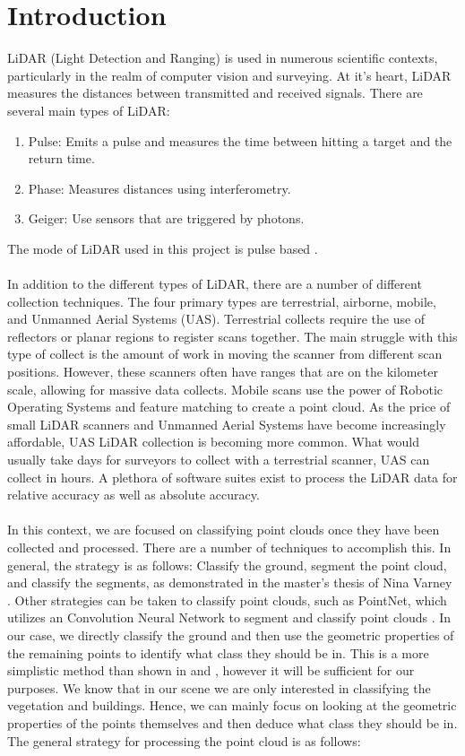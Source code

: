 \documentclass[11pt]{article}
\theoremstyle{definition}
\begin{document}
	\section{Introduction}\label{sec:intro}
	LiDAR (Light Detection and Ranging) is used in numerous scientific contexts, particularly in the realm of computer vision and surveying.  At it's heart, LiDAR measures the distances between transmitted and received signals.  There are several main types of LiDAR:
	\begin{enumerate}  
		\item Pulse: Emits a pulse and measures the time between hitting a target and the return time. 
		\item Phase: Measures distances using interferometry. 
		\item Geiger: Use sensors that are triggered by photons. 

	\end{enumerate}
	The mode of LiDAR used in this project is pulse based \cite{pdal}. 
	\\\\
	In addition to the different types of LiDAR, there are a number of different collection techniques.  The four primary types are terrestrial, airborne, mobile, and Unmanned Aerial Systems (UAS).  Terrestrial collects require the use of reflectors or planar regions to register scans together. The main struggle with this type of collect is the amount of work in moving the scanner from different scan positions.  However, these scanners often have ranges that are on the kilometer scale, allowing for massive data collects.  Mobile scans use the power of Robotic Operating Systems and feature matching to create a point cloud.  As the price of small LiDAR scanners and Unmanned Aerial Systems have become increasingly affordable, UAS LiDAR collection is becoming more common.  What would usually take days for surveyors to collect with a terrestrial scanner, UAS can collect in hours.  A plethora of software suites exist to process the LiDAR data for relative accuracy as well as absolute accuracy.    
	\\\\
	In this context, we are focused on classifying point clouds once they have been collected and processed.  There are a number of techniques to accomplish this.  In general, the strategy is as follows: Classify the ground, segment the point cloud, and classify the segments, as demonstrated in the master's thesis of Nina Varney \cite{varney}.  Other strategies can be taken to classify point clouds, such as PointNet, which utilizes an Convolution Neural Network to segment and classify point clouds \cite{PointNet}.  In our case, we directly classify the ground and then use the geometric properties of the remaining points to identify what class they should be in.  This is a more simplistic method than shown in \cite{PointNet} and \cite{varney}, however it will be sufficient for our purposes.  We know that in our scene we are only interested in classifying the vegetation and buildings.  Hence, we can mainly focus on looking at the geometric properties of the points themselves and then deduce what class they should be in.  The general strategy for processing the point cloud is as follows:  
\end{document}

